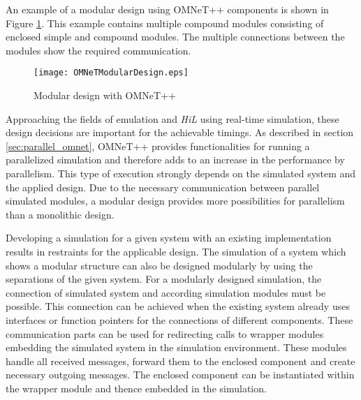 An example of a modular design using OMNeT++ components is shown in Figure \ref{fig:OMNeTModularDesign}.
This example contains multiple compound modules consisting of enclosed simple and compound modules.
The multiple connections between the modules show the required communication.

\begin{figure}
    \centering
    \texttt{[image: OMNeTModularDesign.eps]}
    \caption{Modular design with OMNeT++}
    \label{fig:OMNeTModularDesign}
\end{figure}

Approaching the fields of emulation and \emph{HiL} using real-time simulation, these design decisions are important for the achievable timings.
As described in section \ref{sec:parallel_omnet}, OMNeT++ provides functionalities for running a parallelized simulation and therefore adds to an increase in the performance by parallelism.
This type of execution strongly depends on the simulated system and the applied design.
Due to the necessary communication between parallel simulated modules, a modular design provides more possibilities for parallelism than a monolithic design.

Developing a simulation for a given system with an existing implementation results in restraints for the applicable design.
The simulation of a system which shows a modular structure can also be designed modularly by using the separations of the given system.
For a modularly designed simulation, the connection of simulated system and according simulation modules must be possible.
This connection can be achieved when the existing system already uses interfaces or function pointers for the connections of different components.
These communication parts can be used for redirecting calls to wrapper modules embedding the simulated system in the simulation environment.
These modules handle all received messages, forward them to the enclosed component and create necessary outgoing messages.
The enclosed component can be instantiated within the wrapper module and thence embedded in the simulation.

